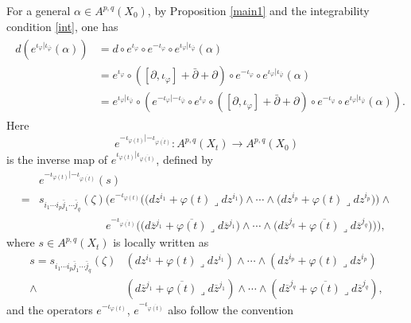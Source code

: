 \documentclass[12pt]{amsart}
\numberwithin{equation}{section}
\renewcommand{\1}{\mathds{1}}
\newcommand{\lc}{\lrcorner}
\renewcommand{\>}{\rightarrow}
\newcommand{\p}{\partial}
\def\p{\partial}
\def\b{\bar}
\begin{document}
For a general $\alpha\in A^{p,q}(X_0)$, by Proposition \ref{main1} and the
integrability condition \eqref{int}, one has
\begin{align}\label{2.5.1}
  \begin{split}
    d(e^{\iota_{\varphi}|\iota_{\b{\varphi}}}(\alpha))&=d\circ e^{\iota_{\varphi}}\circ e^{-\iota_{\varphi}}\circ e^{\iota_{\varphi}|\iota_{\b{\varphi}}}(\alpha)\\
    &=e^{\iota_{\varphi}}\circ\left([\p,\iota_{\varphi}]+\b{\p}+\p\right)\circ e^{-\iota_{\varphi}}\circ e^{\iota_{\varphi}|\iota_{\b{\varphi}}}(\alpha)\\
    &=e^{\iota_{\varphi}|\iota_{\b{\varphi}}}\circ\left(e^{-\iota_{\varphi}|-\iota_{\b{\varphi}}}\circ e^{\iota_{\varphi}}\circ\left([\p,\iota_{\varphi}]+\b{\p}+\p\right)
    \circ e^{-\iota_{\varphi}}\circ
    e^{\iota_{\varphi}|\iota_{\b{\varphi}}}(\alpha)\right).
  \end{split}
\end{align}
Here
$$e^{-\iota_{\varphi(t)}|-\iota_{\overline{\varphi(t)}}}: A^{p,q}(X_t)\>
A^{p,q}(X_0)$$
 is the
 inverse map of
$e^{\iota_{\varphi(t)}|\iota_{\overline{\varphi(t)}}}$, defined by
\begin{equation}\label{ephi-inv}
 \begin{aligned}
   & e^{-\iota_{\varphi(t)}|-\iota_{\overline{\varphi(t)}}}(s)\\
 =&s_{i_1\cdots i_p \bar{j}_1 \cdots \bar{j}_q}(\zeta)
 \bigg(e^{-\iota_{\varphi(t)}}\Big( \big(dz^{i_1}+\varphi(t)\lc
dz^{i_1}\big) \wedge \cdots \wedge
\big(dz^{i_p}+\varphi(t) \lc dz^{i_p}\big) \Big) \wedge\\
&\qquad\qquad\qquad e^{-\iota_{\overline{\varphi(t)}}} \Big(
\big(d\overline{z}^{j_1}+\overline{\varphi(t)}\lc
d\overline{z}^{j_1}\big) \wedge \cdots \wedge \big(
d\overline{z}^{j_q}+\overline{\varphi(t)}\lc d\overline{z}^{j_q}
\big)\Big)\bigg),
\end{aligned}
\end{equation}
where $s\in A^{p,q}(X_t)$ is locally written as
\begin{align*}
s=s_{i_1\cdots i_p \bar{j}_1 \cdots \bar{j}_q}(\zeta)
&(dz^{i_1}+\varphi(t)\lc dz^{i_1}) \wedge \cdots\wedge
(dz^{i_p}+\varphi(t)\lc dz^{i_p})\\
\wedge &(d\overline{z}^{j_1}+\overline{\varphi(t)}\lc
d\overline{z}^{j_1})\wedge\cdots\wedge
(d\overline{z}^{j_q}+\overline{\varphi(t)}\lc d\overline{z}^{j_q}),
\end{align*}
 and the operators $e^{-\iota_{\varphi(t)}}$,
$e^{-\iota_{\overline{\varphi(t)}}}$ also follow the convention
\end{document}
